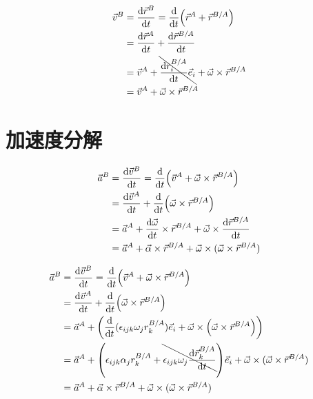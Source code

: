 \begin{equation}
  \begin{split}
    \vec{v}^B&=\frac{\mathrm{d}\vec{r}^B}{\mathrm{d}t}=\frac{\mathrm{d}}{\mathrm{d}t}\qty(\vec{r}^A+\vec{r}^{B/A})\\
    &=\frac{\mathrm{d}\vec{r}^A}{\mathrm{d}t}+\frac{\mathrm{d}\vec{r}^{B/A}}{\mathrm{d}t}\\
    &=\vec{v}^A+\bcancel{\frac{\mathrm{d}r^{B/A}_i}{\mathrm{d}t}\vec{e}_i}+\vec{\omega}\times\vec{r}^{B/A}\\
    &=\vec{v}^A+\vec{\omega}\times\vec{r}^{B/A}
  \end{split}
\end{equation}

\section{加速度分解}
\begin{equation}
  \begin{split}
    \vec{a}^B&=\frac{\mathrm{d}\vec{v}^B}{\mathrm{d}t}=\frac{\mathrm{d}}{\mathrm{d}t}\qty(\vec{v}^A+\vec{\omega}\times\vec{r}^{B/A})\\
    &=\frac{\mathrm{d}\vec{v}^A}{\mathrm{d}t}+\frac{\mathrm{d}}{\mathrm{d}t}\qty(\vec{\omega}\times\vec{r}^{B/A})\\
    &=\vec{a}^A+\frac{\mathrm{d}\vec{\omega}}{\mathrm{d}t}\times\vec{r}^{B/A}+\vec{\omega}\times\frac{\mathrm{d}\vec{r}^{B/A}}{\mathrm{d}t}\\
    &=\vec{a}^A+\vec{\alpha}\times\vec{r}^{B/A}+\vec{\omega}\times(\vec{\omega}\times\vec{r}^{B/A})
  \end{split}
\end{equation}

\begin{equation}
  \begin{split}
    \vec{a}^B&=\frac{\mathrm{d}\vec{v}^B}{\mathrm{d}t}=\frac{\mathrm{d}}{\mathrm{d}t}\qty(\vec{v}^A+\vec{\omega}\times\vec{r}^{B/A})\\
    &=\frac{\mathrm{d}\vec{v}^A}{\mathrm{d}t}+\frac{\mathrm{d}}{\mathrm{d}t}\qty(\vec{\omega}\times\vec{r}^{B/A})\\
    &=\vec{a}^A+\qty(\frac{\mathrm{d}}{\mathrm{d}t}(\epsilon_{ijk}\omega_jr^{B/A}_k)\vec{e}_i+\vec{\omega}\times\qty(\vec{\omega}\times\vec{r}^{B/A}))\\
    &=\vec{a}^A+\qty(\epsilon_{ijk}\alpha_jr^{B/A}_k+\bcancel{\epsilon_{ijk}\omega_j\frac{\mathrm{d}\vec{r}^{B/A}_k}{\mathrm{d}t}})\vec{e}_i+\vec{\omega}\times(\vec{\omega}\times\vec{r}^{B/A})\\
    &=\vec{a}^A+\vec{\alpha}\times\vec{r}^{B/A}+\vec{\omega}\times(\vec{\omega}\times\vec{r}^{B/A})
  \end{split}
\end{equation}

